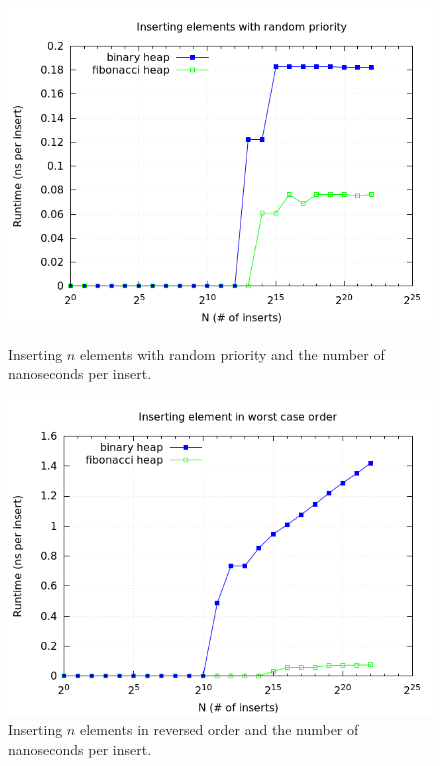 \documentclass[a4paper,oneside,article,11pt]{memoir}
\begin{document}
\begin{figure}[H]
\centering
\begin{minipage}{0.48\columnwidth}
  \centering
  \includegraphics[width=\linewidth]{../res/inserts/insert_random_time.png}%
  \caption{Inserting $n$ elements with random priority and the number of nanoseconds per insert.}
  \label{fig:insert_t_random}
\end{minipage}%
\hfill
\begin{minipage}{0.48\columnwidth}
  \centering
  \includegraphics[width=\linewidth]{../res/inserts/insert_worst_time.png}%
  \caption{Inserting $n$ elements in reversed order and the number of nanoseconds per insert.}
  \label{fig:insert_t_worst}
\end{minipage}
\end{figure}
\end{document}
